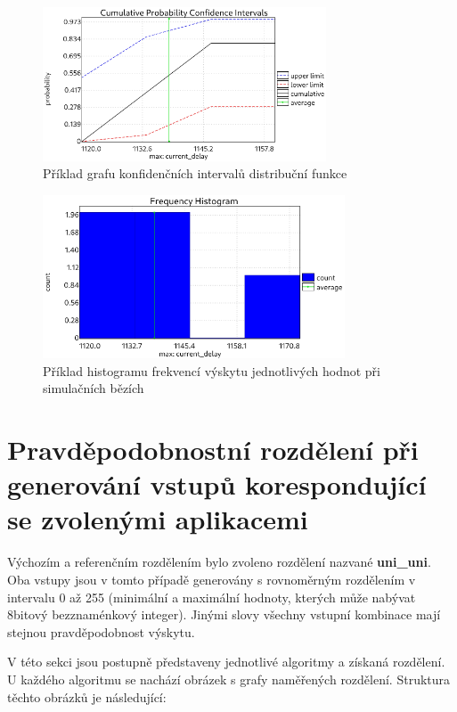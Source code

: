 \begin{figure}[H]
    \centering
    \includegraphics[width=0.75\textwidth]{obrazky-figures/plot_conf_ints.png}
    \caption{Příklad grafu konfidenčních intervalů distribuční funkce}
    \label{fig:plot_conf_ints}
\end{figure}

\begin{figure}[H]
    \centering
    \includegraphics[width=0.8\textwidth]{obrazky-figures/plot_freq_hist.png}
    \caption{Příklad histogramu frekvencí výskytu jednotlivých hodnot při simulačních bězích}
    \label{fig:plot_freq_hist}
\end{figure}

\chapter{Pravděpodobnostní rozdělení při generování vstupů korespondující se zvolenými aplikacemi} \label{append:rozdeleni_pst}
Výchozím a referenčním rozdělením bylo zvoleno rozdělení nazvané \textbf{uni\_uni}. Oba vstupy jsou v tomto případě generovány s rovnoměrným rozdělením v intervalu 0 až 255 (minimální a maximální hodnoty, kterých může nabývat 8bitový bezznaménkový integer). Jinými slovy všechny vstupní kombinace mají stejnou pravděpodobnost výskytu.

V této sekci jsou postupně představeny jednotlivé algoritmy a získaná rozdělení. U každého algoritmu se nachází obrázek s grafy naměřených rozdělení. Struktura těchto obrázků je následující:

